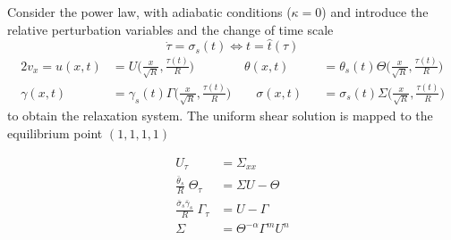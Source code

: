 \documentclass{beamer}
\begin{document}
\begin{frame}\frametitle{}

{\small
Consider the power law, with adiabatic conditions ($\kappa = 0$) and  introduce
the {\color{red} relative perturbation variables} and the {\color{blue} change of time scale}
$$
\dot \tau = \sigma_s (t)  \Longleftrightarrow t = \hat t (\tau)
$$
\begin{alignat*}{2}
v_x = u(x,t) &= U \big ( \frac{x}{\sqrt{R}} , \frac{\tau(t)}{R} \big ) \qquad \qquad
\theta (x,t) &&= \theta_s(t) \Theta \big ( \frac{x}{\sqrt{R}} , \frac{\tau(t)}{R} \big )
\\
\gamma (x,t) &= \gamma_s(t) \Gamma \big ( \frac{x}{\sqrt{R}} , \frac{\tau(t)}{R} \big )
\qquad
\sigma (x,t) &&= \sigma_s(t) \Sigma \big ( \frac{x}{\sqrt{R}} , \frac{\tau(t)}{R} \big )
\end{alignat*}
to obtain the {\color{blue} relaxation system}. The uniform shear solution is mapped
to the equilibrium point  $(1,1,1,1)$

\smallskip
$$
\begin{aligned}
U_\tau &= \Sigma_{xx}
\\
{\textstyle \frac{\bar \theta_s}{R}} \; \Theta_\tau &= \Sigma U - \Theta
\\
{\textstyle \frac{\bar \sigma_s \bar   \gamma_s}{R}} \; \Gamma_\tau &= U - \Gamma
\\
\Sigma &= \Theta^{-\alpha} \Gamma^m U^n
\end{aligned}
$$

}

\end{frame}
\end{document}
